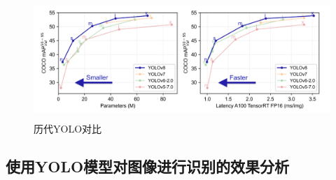 \documentclass[UTF8]{ctexart}
\begin{document}
\begin{figure}[H]
    \centering %
    \includegraphics[height=4.5cm]{../YOLO/pics/img.png}
    \caption{历代YOLO对比}
\end{figure}

\subsection{使用YOLO模型对图像进行识别的效果分析}

\newpage
\small



\end{document}
